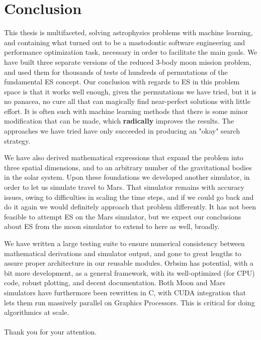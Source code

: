 
\chapter{Conclusion}
This thesis is multifaceted, solving astrophysics problems with machine learning, and containing what turned out to be a mastodontic software engineering and performance optimization task, necessary in order to facilitate the main goals. We have built three separate versions of the reduced 3-body moon mission problem, and used them for thousands of tests of hundreds of permutations of the fundamental ES concept. Our conclusion with regards to ES in this problem space is that it works well enough, given the permutations we have tried, but it is no panacea, no cure all that can magically find near-perfect solutions with little effort. It is often such with machine learning methods that there is some minor modification that can be made, which \textbf{radically} improves the results. The approaches we have tried have only succeeded in producing an "okay" search strategy. 

We have also derived mathematical expressions that expand the problem into three spatial dimensions, and to an arbitrary number of the gravitational bodies in the solar system. Upon these foundations we developed another simulator, in order to let us simulate travel to Mars. That simulator remains with accuracy issues, owing to difficulties in scaling the time steps, and if we could go back and do it again we would definitely approach that problem differently. It has not been feasible to attempt ES on the Mars simulator, but we expect our conclusions about ES from the moon simulator to extend to here as well, broadly.

We have written a large testing suite to ensure numerical consistency between mathematical derivations and simulator output, and gone to great lengths to assure proper architecture in our reusable modules. Orbsim has potential, with a bit more development, as a general framework, with its well-optimized (for CPU) code, robust plotting, and decent documentation. Both Moon and Mars simulators have furthermore been rewritten in C, with CUDA integration that lets them run massively parallel on Graphics Processors. This is critical for doing algorithmics at scale. \\
\\[1cm]
{\Large Thank you for your attention.}